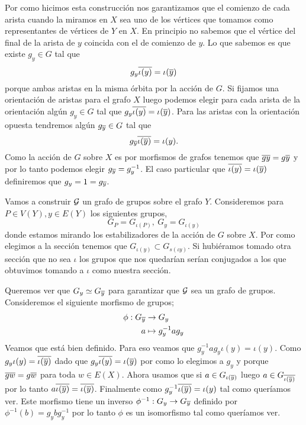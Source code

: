 \documentclass[tesis.tex]{subfiles}
\begin{document}
Por como hicimos esta construcción nos garantizamos que el comienzo de cada arista cuando la miramos en $X$ sea uno de los vértices que tomamos como representantes de vértices de $Y$ en $X$.
En principio no sabemos que el vértice del final de la arista de $y$ coincida con el de comienzo de $y$. 
Lo que sabemos es que existe $g_y \in G$ tal que 
\[
	g_y \overline{\iota (y)} = \iota (\overline y)
\]
porque ambas aristas en la misma órbita por la acción de $G$.
Si fijamos una orientación de aristas para el grafo $X$ luego podemos elegir para cada arista de la orientación algún $g_y \in G$ tal que $g_y \overline{\iota (y)} = \iota (\overline y)$.
Para las aristas con la orientación opuesta tendremos algún $g_{\overline y} \in G$ tal que 
\[
	g_{\overline y} \overline{\iota(\overline y)} = \iota(y).
\]
Como la acción de $G$ sobre $X$ es por morfismos de grafos tenemos que $\overline {g y} = g \overline y$ y por lo tanto podemos elegir $g_{\overline y} = g_{y}^{-1}$.
El caso particular que $\overline{\iota (y)} = \iota (\overline y)$ definiremos que $g_y = 1 = g_{\overline y}$.

Vamos a construir ${\cal G}$ un grafo de grupos sobre el grafo $Y$.
Consideremos para $P \in V(Y), y \in E(Y)$ los siguientes grupos,
\[
	G_P = G_{\iota (P)}, \ G_y = G_{\iota(y)}
\]
donde estamos mirando los estabilizadores de la acción de $G$ sobre $X$.
Por como elegimos a la sección tenemos que $G_{\iota(y)} \subset G_{s(\iota y)}$. 
Si hubiéramos tomado otra sección que no sea $\iota$ los grupos que nos quedarían serían conjugados a los que obtuvimos tomando a $\iota$ como nuestra sección.

Queremos ver que $G_{y} \simeq G_{\overline y}$ para garantizar que ${\cal G}$ sea un grafo de grupos.
Consideremos el siguiente morfismo de grupos;
\begin{align*}
	\phi: G_{\overline y} &\to G_{y} \\
	a &\mapsto g_{y}^{-1}ag_{y}
\end{align*}
Veamos que está bien definido. 
Para eso veamos que $g_{y}^{-1}ag_{y} \iota(y) = \iota(y)$.
Como $g_y \iota(y) = \overline{\iota(\overline y)}$ dado que $g_y \overline{\iota(y)} = \iota (\overline y)$ por como lo elegimos a $g_y$ y porque $\overline{gw} = g \overline w$ para toda $w \in E(X)$.
Ahora usamos que si $a \in G_{\iota({\overline y})}$ luego $a \in G_{\overline{\iota(\overline y)}}$ por lo tanto $a \overline{\iota(\overline y)} = \overline{\iota(\overline y)} $.
Finalmente como $ g_{y}^{-1} \overline {\iota (\overline y) } = \iota (y)$ tal como queríamos ver.
Este morfismo tiene un inverso $\phi^{-1}: G_{y} \to G_{\overline y}$ definido por $\phi^{-1}(b) = g_{y}bg_{y}^{-1}$ por lo tanto $\phi$ es un isomorfismo tal como queríamos ver.
\end{document}
